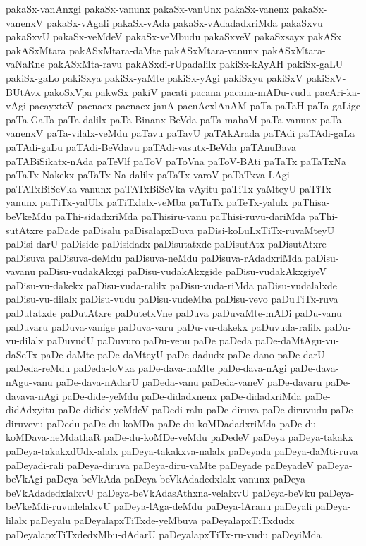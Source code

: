 {pakaSx-vanAnxgi
pakaSx-vanunx
pakaSx-vanUnx
pakaSx-vanenx
pakaSx-vanenxV
pakaSx-vAgali
pakaSx-vAda
pakaSx-vAdadadxriMda
pakaSxvu
pakaSxvU
pakaSx-veMdeV
pakaSx-veMbudu
pakaSxveV
pakaSxsayx
pakASx
pakASxMtara
pakASxMtara-daMte
pakASxMtara-vanunx
pakASxMtara-vaNaRne
pakASxMta-ravu
pakASxdi-rUpadalilx
pakiSx-kAyAH
pakiSx-gaLU
pakiSx-gaLo
pakiSxya
pakiSx-yaMte
pakiSx-yAgi
pakiSxyu
pakiSxV
pakiSxV-BUtAvx
pakoSxVpa
pakwSx
pakiV
pacati
pacana
pacana-mADu-vudu
pacAri-ka-vAgi
pacayxteV
pacnacx
pacnacx-janA
pacnAcxlAnAM
paTa
paTaH
paTa-gaLige
paTa-GaTa
paTa-dalilx
paTa-Binanx-BeVda
paTa-mahaM
paTa-vanunx
paTa-vanenxV
paTa-vilalx-veMdu
paTavu
paTavU
paTAkArada
paTAdi
paTAdi-gaLa
paTAdi-gaLu
paTAdi-BeVdavu
paTAdi-vasutx-BeVda
paTAnuBava
paTABiSikatx-nAda
paTeVlf
paToV
paToVna
paToV-BAti
paTaTx
paTaTxNa
paTaTx-Nakekx
paTaTx-Na-dalilx
paTaTx-varoV
paTaTxva-LAgi
paTATxBiSeVka-vanunx
paTATxBiSeVka-vAyitu
paTiTx-yaMteyU
paTiTx-yanunx
paTiTx-yalUlx
paTiTxlalx-veMba
paTuTx
paTeTx-yalulx
paThisa-beVkeMdu
paThi-sidadxriMda
paThisiru-vanu
paThisi-ruvu-dariMda
paThi-sutAtxre
paDade
paDisalu
paDisalapxDuva
paDisi-koLuLxTiTx-ruvaMteyU
paDisi-darU
paDiside
paDisidadx
paDisutatxde
paDisutAtx
paDisutAtxre
paDisuva
paDisuva-deMdu
paDisuva-neMdu
paDisuva-rAdadxriMda
paDisu-vavanu
paDisu-vudakAkxgi
paDisu-vudakAkxgide
paDisu-vudakAkxgiyeV
paDisu-vu-dakekx
paDisu-vuda-ralilx
paDisu-vuda-riMda
paDisu-vudalalxde
paDisu-vu-dilalx
paDisu-vudu
paDisu-vudeMba
paDisu-vevo
paDuTiTx-ruva
paDutatxde
paDutAtxre
paDutetxVne
paDuva
paDuvaMte-mADi
paDu-vanu
paDuvaru
paDuva-vanige
paDuva-varu
paDu-vu-dakekx
paDuvuda-ralilx
paDu-vu-dilalx
paDuvudU
paDuvuro
paDu-venu
paDe
paDeda
paDe-daMtAgu-vu-daSeTx
paDe-daMte
paDe-daMteyU
paDe-dadudx
paDe-dano
paDe-darU
paDeda-reMdu
paDeda-loVka
paDe-dava-naMte
paDe-dava-nAgi
paDe-dava-nAgu-vanu
paDe-dava-nAdarU
paDeda-vanu
paDeda-vaneV
paDe-davaru
paDe-davava-nAgi
paDe-dide-yeMdu
paDe-didadxnenx
paDe-didadxriMda
paDe-didAdxyitu
paDe-dididx-yeMdeV
paDedi-ralu
paDe-diruva
paDe-diruvudu
paDe-diruvevu
paDedu
paDe-du-koMDa
paDe-du-koMDadadxriMda
paDe-du-koMDava-neMdathaR
paDe-du-koMDe-veMdu
paDedeV
paDeya
paDeya-takakx
paDeya-takakxdUdx-alalx
paDeya-takakxva-nalalx
paDeyada
paDeya-daMti-ruva
paDeyadi-rali
paDeya-diruva
paDeya-diru-vaMte
paDeyade
paDeyadeV
paDeya-beVkAgi
paDeya-beVkAda
paDeya-beVkAdadedxlalx-vanunx
paDeya-beVkAdadedxlalxvU
paDeya-beVkAdasAthxna-velalxvU
paDeya-beVku
paDeya-beVkeMdi-ruvudelalxvU
paDeya-lAga-deMdu
paDeya-lAranu
paDeyali
paDeya-lilalx
paDeyalu
paDeyalapxTiTxde-yeMbuva
paDeyalapxTiTxdudx
paDeyalapxTiTxdedxMbu-dAdarU
paDeyalapxTiTx-ru-vudu
paDeyiMda
}
